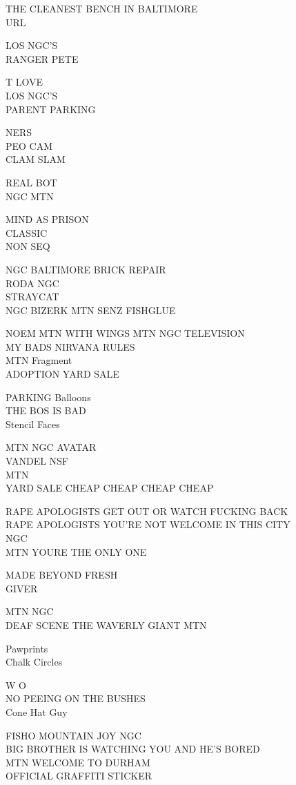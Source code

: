 \documentclass[10pt,letterpaper]{article}
\begin{document}
THE CLEANEST BENCH IN BALTIMORE\\
URL

LOS NGC'S\\
RANGER PETE

T LOVE\\
LOS NGC'S\\
PARENT PARKING

NERS\\
PEO CAM\\
CLAM SLAM

REAL BOT\\
NGC MTN

MIND AS PRISON\\
CLASSIC\\
NON SEQ

NGC BALTIMORE BRICK REPAIR\\
RODA NGC\\
STRAYCAT\\
NGC BIZERK MTN SENZ FISHGLUE

NOEM MTN WITH WINGS MTN NGC TELEVISION\\
MY BADS NIRVANA RULES\\
MTN Fragment\\
ADOPTION YARD SALE

PARKING Balloons\\
THE BOS IS BAD\\
Stencil Faces

MTN NGC AVATAR\\
VANDEL NSF\\
MTN\\
YARD SALE CHEAP CHEAP CHEAP CHEAP

RAPE APOLOGISTS GET OUT OR WATCH FUCKING BACK\\
RAPE APOLOGISTS YOU'RE NOT WELCOME IN THIS CITY\\
NGC\\
MTN YOURE THE ONLY ONE

MADE BEYOND FRESH\\
GIVER

MTN NGC\\
DEAF SCENE THE WAVERLY GIANT MTN

Pawprints\\
Chalk Circles

W O\\
NO PEEING ON THE BUSHES\\
Cone Hat Guy

FISHO MOUNTAIN JOY NGC\\
BIG BROTHER IS WATCHING YOU AND HE'S BORED\\
MTN WELCOME TO DURHAM\\
OFFICIAL GRAFFITI STICKER
\end{document}
